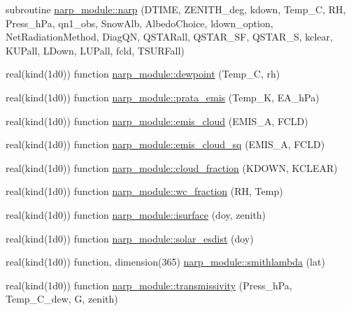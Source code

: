 \begin{DoxyCompactItemize}
\item 
subroutine \hyperlink{namespacenarp__module_ac480c3115a6413b9e79770f601e68895}{narp\+\_\+module\+::narp} (D\+T\+I\+ME, Z\+E\+N\+I\+T\+H\+\_\+deg, kdown, Temp\+\_\+C, RH, Press\+\_\+h\+Pa, qn1\+\_\+obs, Snow\+Alb, Albedo\+Choice, ldown\+\_\+option, Net\+Radiation\+Method, Diag\+QN, Q\+S\+T\+A\+Rall, Q\+S\+T\+A\+R\+\_\+\+SF, Q\+S\+T\+A\+R\+\_\+S, kclear, K\+U\+Pall, L\+Down, L\+U\+Pall, fcld, T\+S\+U\+R\+Fall)
\item 
real(kind(1d0)) function \hyperlink{namespacenarp__module_a29289ed438f8c8f40bb9cafd90c8f87c}{narp\+\_\+module\+::dewpoint} (Temp\+\_\+C, rh)
\item 
real(kind(1d0)) function \hyperlink{namespacenarp__module_acfe7f0cf64c053bc528f54bde3ce8194}{narp\+\_\+module\+::prata\+\_\+emis} (Temp\+\_\+K, E\+A\+\_\+h\+Pa)
\item 
real(kind(1d0)) function \hyperlink{namespacenarp__module_aa7b0905bdc9e31e2a01ef14da0f281d5}{narp\+\_\+module\+::emis\+\_\+cloud} (E\+M\+I\+S\+\_\+A, F\+C\+LD)
\item 
real(kind(1d0)) function \hyperlink{namespacenarp__module_a51caa7fe09922df4896ec5e4b7c564a8}{narp\+\_\+module\+::emis\+\_\+cloud\+\_\+sq} (E\+M\+I\+S\+\_\+A, F\+C\+LD)
\item 
real(kind(1d0)) function \hyperlink{namespacenarp__module_a94b9c5403af8719752cf8b8f995cd207}{narp\+\_\+module\+::cloud\+\_\+fraction} (K\+D\+O\+WN, K\+C\+L\+E\+AR)
\item 
real(kind(1d0)) function \hyperlink{namespacenarp__module_a1774d32db350c89aad964f2f45ceb46e}{narp\+\_\+module\+::wc\+\_\+fraction} (RH, Temp)
\item 
real(kind(1d0)) function \hyperlink{namespacenarp__module_a67c38c5ffd466f983c36961a978ca980}{narp\+\_\+module\+::isurface} (doy, zenith)
\item 
real(kind(1d0)) function \hyperlink{namespacenarp__module_ada3ea94f7e9dc6f9fc5bc22c4b1d8a68}{narp\+\_\+module\+::solar\+\_\+esdist} (doy)
\item 
real(kind(1d0)) function, dimension(365) \hyperlink{namespacenarp__module_a2855b93202c40f690a05a6febcdc8067}{narp\+\_\+module\+::smithlambda} (lat)
\item 
real(kind(1d0)) function \hyperlink{namespacenarp__module_aeae3a1e345682a38338ecdf71bcf1c8e}{narp\+\_\+module\+::transmissivity} (Press\+\_\+h\+Pa, Temp\+\_\+\+C\+\_\+dew, G, zenith)
\end{DoxyCompactItemize}
